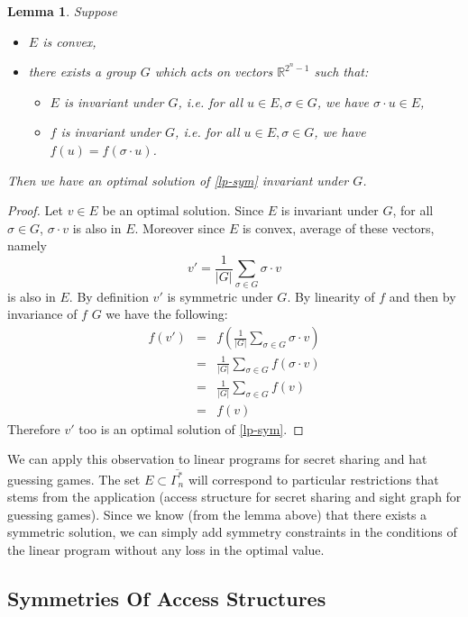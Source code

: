 \documentclass[11pt, a4paper]{kybernetika}
\newtheorem{lemma}[theorem]{Lemma}
\begin{document}
	\begin{lemma}\label{l:prop-sym}
		Suppose
		\begin{itemize}
			\item $E$ is convex,
			\item there exists a group $G$ which acts on vectors $\mathbb{R}^{2^n-1}$ such that:
			\begin{itemize}
				\item $E$ is invariant under $G$, i.e. for all $u\in E,\sigma\in G$, we have $\sigma\cdot u\in E$,
				\item $f$ is invariant under $G$, i.e. for all $u\in E,\sigma\in G$, we have $f(u)=f(\sigma\cdot u)$.
			\end{itemize}
		\end{itemize}
		Then we have an optimal solution of \ref{lp-sym} invariant under $G$. 
	\end{lemma}
	\begin{proof}
		Let $v\in E$ be an optimal solution. Since $E$ is invariant under $G$, for all $\sigma\in G$, $\sigma\cdot v$ is also in $E$. Moreover since $E$ is convex, average of these vectors, namely $$v'=\frac1{|G|}\sum_{\sigma\in G}\sigma\cdot v$$ is also in $E$. By definition $v'$ is symmetric under $G$. By linearity of $f$ and then by invariance of $f$ $G$ we have the following:
		$$
		\begin{array}{rcl}
			f(v')&=&f(\frac1{|G|}\sum_{\sigma\in G}\sigma\cdot v)\\
			&=&\frac1{|G|}\sum_{\sigma\in G}f(\sigma\cdot v)\\
			&=&\frac1{|G|}\sum_{\sigma\in G}f(v)\\
			&=&f(v)
		\end{array}
		$$
		Therefore $v'$ too is an optimal solution of \ref{lp-sym}.
	\end{proof}
	
	We can apply this observation to linear programs for secret sharing and hat guessing games. The set $E\subset\overline{\Gamma_n^*}$ will correspond to particular restrictions that stems from the application (access structure for secret sharing and sight graph for guessing games). Since we know (from the lemma above) that there exists a symmetric solution, we can simply add symmetry constraints in the conditions of the linear program without any loss in the optimal value.
	
	\subsection{Symmetries Of Access Structures}\label{s:sym}
	
\end{document}
